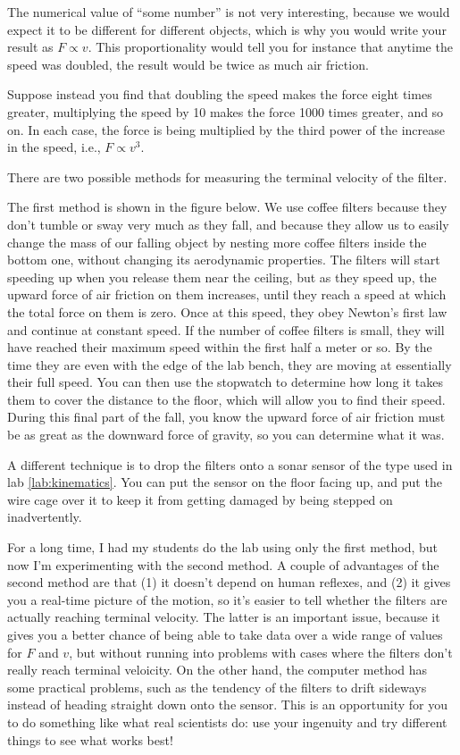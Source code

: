 The numerical value of ``some number'' is not very
interesting, because we would expect it to be different for
different objects, which is why you would write your result
as $F\propto v$. This proportionality would tell you for
instance that anytime the speed was doubled, the result
would be twice as much air friction.

Suppose instead you find that doubling the speed makes the
force eight times greater, multiplying the speed by 10 makes
the force 1000 times greater, and so on. In each case, the
force is being multiplied by the third power of the increase
in the speed, i.e., $F\propto v^3$.

\observations

There are two possible methods for measuring the terminal velocity
of the filter.

The first method is shown in the figure below. We use coffee
filters because they don't tumble or sway very much as they
fall, and because they allow us to easily change the mass of
our falling object by nesting more coffee filters inside the
bottom one, without changing its aerodynamic properties.
The filters will start speeding up when you release them
near the ceiling, but as they speed up, the upward force of
air friction on them increases, until they reach a speed at
which the total force on them is zero. Once at this speed,
they obey Newton's first law and continue at constant speed.
If the number of coffee filters is small,
they will have reached their maximum speed within the first
half a meter or so. By the time they are even with the edge
of the lab bench, they are moving at essentially their full
speed. You can then use the stopwatch to determine how long
it takes them to cover the distance to the floor, which will
allow you to find their speed. During this final part of the
fall, you know the upward force of air friction must be as
great as the downward force of gravity, so you can
determine what it was.


A different technique is to drop the filters onto a sonar
sensor of the type used in lab \ref{lab:kinematics}. You can
put the sensor on the floor facing up, and put the wire cage
over it to keep it from getting damaged by being stepped on
inadvertently.

For a long time, I had my students do the lab using only the
first method, but now I'm experimenting with the second method.
A couple of advantages of the second method are that (1) it doesn't
depend on human reflexes, and (2) it gives you a real-time picture
of the motion, so it's easier to tell whether the filters are
actually reaching terminal velocity. The latter is an important
issue, because it gives you a better chance of being able to take
data over a wide range of values for $F$ and $v$, but without
running into problems with cases where the filters don't really
reach terminal veloicity. On the other hand, the computer method
has some practical problems, such as the tendency of the filters
to drift sideways instead of heading straight down onto the sensor.
This is an opportunity for you to do something like what real
scientists do: use your ingenuity and try different things to see
what works best!

